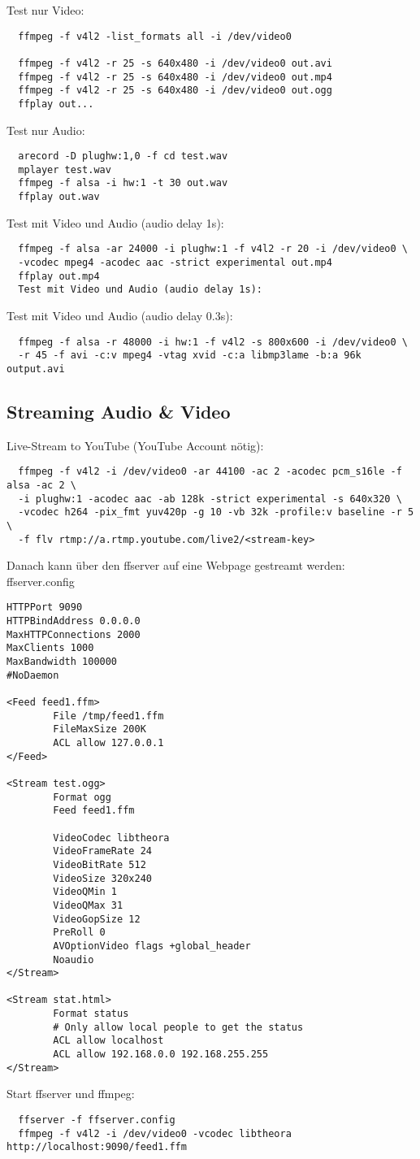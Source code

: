 Test nur Video:
\begin{verbatim}
  ffmpeg -f v4l2 -list_formats all -i /dev/video0

  ffmpeg -f v4l2 -r 25 -s 640x480 -i /dev/video0 out.avi
  ffmpeg -f v4l2 -r 25 -s 640x480 -i /dev/video0 out.mp4
  ffmpeg -f v4l2 -r 25 -s 640x480 -i /dev/video0 out.ogg
  ffplay out...
\end{verbatim}

Test nur Audio:
\begin{verbatim}
  arecord -D plughw:1,0 -f cd test.wav
  mplayer test.wav
  ffmpeg -f alsa -i hw:1 -t 30 out.wav
  ffplay out.wav
\end{verbatim}

Test mit Video und Audio (audio delay 1s):
\begin{verbatim}
  ffmpeg -f alsa -ar 24000 -i plughw:1 -f v4l2 -r 20 -i /dev/video0 \
  -vcodec mpeg4 -acodec aac -strict experimental out.mp4
  ffplay out.mp4
  Test mit Video und Audio (audio delay 1s):
\end{verbatim}
Test mit Video und Audio (audio delay 0.3s):
\begin{verbatim}
  ffmpeg -f alsa -r 48000 -i hw:1 -f v4l2 -s 800x600 -i /dev/video0 \
  -r 45 -f avi -c:v mpeg4 -vtag xvid -c:a libmp3lame -b:a 96k output.avi
\end{verbatim}

\subsection{Streaming Audio \& Video}
Live-Stream to YouTube (YouTube Account nötig):
\begin{verbatim}
  ffmpeg -f v4l2 -i /dev/video0 -ar 44100 -ac 2 -acodec pcm_s16le -f alsa -ac 2 \
  -i plughw:1 -acodec aac -ab 128k -strict experimental -s 640x320 \
  -vcodec h264 -pix_fmt yuv420p -g 10 -vb 32k -profile:v baseline -r 5 \ 
  -f flv rtmp://a.rtmp.youtube.com/live2/<stream-key>
\end{verbatim}

Danach kann über den ffserver auf eine Webpage gestreamt werden:\\
ffserver.config
\begin{verbatim}
HTTPPort 9090
HTTPBindAddress 0.0.0.0
MaxHTTPConnections 2000
MaxClients 1000
MaxBandwidth 100000
#NoDaemon

<Feed feed1.ffm>
        File /tmp/feed1.ffm
        FileMaxSize 200K
        ACL allow 127.0.0.1
</Feed>

<Stream test.ogg>
        Format ogg
        Feed feed1.ffm

        VideoCodec libtheora
        VideoFrameRate 24
        VideoBitRate 512
        VideoSize 320x240
        VideoQMin 1
        VideoQMax 31
        VideoGopSize 12
        PreRoll 0
        AVOptionVideo flags +global_header
        Noaudio
</Stream>

<Stream stat.html>
        Format status
        # Only allow local people to get the status
        ACL allow localhost
        ACL allow 192.168.0.0 192.168.255.255
</Stream>                         
\end{verbatim}

Start ffserver und ffmpeg:
\begin{verbatim}
  ffserver -f ffserver.config
  ffmpeg -f v4l2 -i /dev/video0 -vcodec libtheora http://localhost:9090/feed1.ffm
\end{verbatim}



